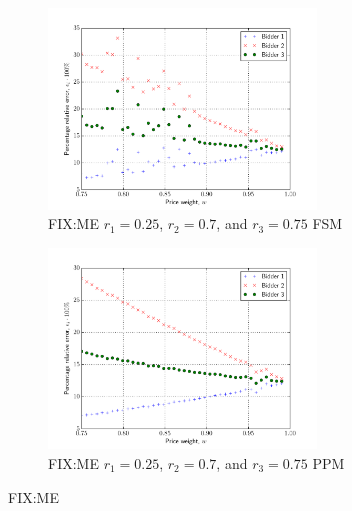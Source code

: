 \begin{figure}[p!]
  \setcounter{subfigure}{0}
  \begin{subfigure}[b]{0.5\textwidth}
    \includegraphics[width=2.8in]{Approximation/Figures/compare_3_bidders_025_070_075}
    \caption{FIX:ME $r_1=0.25$, $r_2=0.7$, and $r_3=0.75$ FSM}
    \label{fig:compare_3_bidders_025_070_075_fsm_approximation}
  \end{subfigure}
  \begin{subfigure}[b]{0.5\textwidth}
    \includegraphics[width=2.8in]{Approximation/Figures/compare_3_bidders_025_070_075_ppm}
    \caption{FIX:ME $r_1=0.25$, $r_2=0.7$, and $r_3=0.75$ PPM}
    \label{fig:compare_3_bidders_025_070_075_ppm_approximation}
  \end{subfigure}
  \caption{FIX:ME}
  \label{fig:compare_3_bidders_025_070_075_approximation}


\end{figure}
